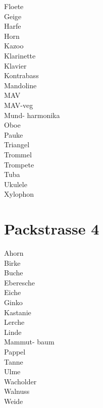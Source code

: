\documentclass{article}
\begin{document}
Floete
\\


Geige
\\


Harfe
\\


Horn
\\


Kazoo
\\


Klarinette
\\


Klavier
\\


Kontrabass
\\


Mandoline
\\

MAV
\\

MAV-veg
\\

Mund-
harmonika
\\


Oboe
\\


Pauke
\\


Triangel
\\


Trommel
\\


Trompete
\\


Tuba
\\


Ukulele
\\


Xylophon
\\

\newpage
\section{Packstrasse 4}


Ahorn
\\


Birke
\\


Buche
\\


Eberesche
\\


Eiche
\\


Ginko
\\


Kastanie
\\



Lerche
\\


Linde
\\


Mammut-
baum
\\


Pappel
\\


Tanne
\\


Ulme
\\


Wacholder
\\


Walnuss
\\


Weide
\\
\end{document}
